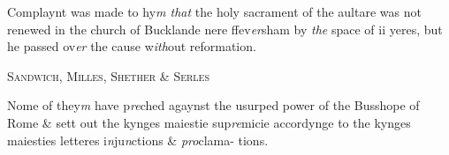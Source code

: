\documentclass[12pt, a4paper]{book}
\begin{document}
				\marginpar[\vspace{0.5cm}{\textcolor{Gray}{ceremonies}}]{}
			
		\ifthenelse{\isodd{\thepage}}
		{\reversemarginpar}
		{\normalmarginpar}
		Complaynt was made to hy\textit{m that} the holy sacrament of the
 aultare was not renewed in the church of Bucklande nere
	ffev\textit{er}sham by \textit{the} space of ii yeres, but he passed ov\textit{er} the cause
 	w\textit{ith}out reformation.
 

            
            	
				\begin{center} \begin{large} {\scshape Sandwich, Milles, Shether \& Serles} \end{large} \end{center}
			

            	
				\marginpar[\vspace{0.5cm}{\textcolor{Gray}{n}}]{}
			
			
		\ifthenelse{\isodd{\thepage}}
		{\reversemarginpar}
		{\normalmarginpar}
		Nome of they\textit{m} have p\textit{re}ched agaynst the usurped power of
 the Busshope of Rome \& sett out the kynges maiestie sup\textit{re}micie
 accordynge to the kynges maiesties letteres i\textit{n}ju\textit{n}ctions \& \textit{pro}clama-
 tions.


            
\dotfill
					  \subsection*{}  \subsection*{}  \subsection*{}  \subsection*{}  \subsection*{}
\end{document}
